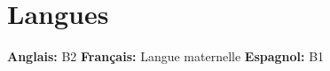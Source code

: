 \section{Langues}\label{sec:langues}
\noindent
\textbf{Anglais:} B2 \quad \textbf{Français:} Langue maternelle \quad \textbf{Espagnol:} B1
